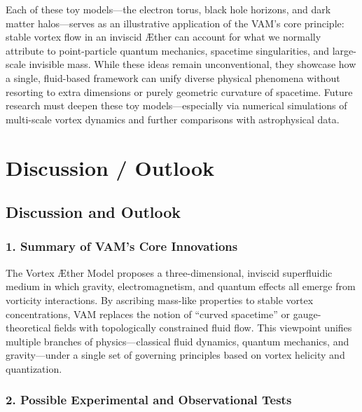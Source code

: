 \documentclass[aps,preprint,superscriptaddress]{revtex4-2}
\begin{document}
    Each of these toy models—the electron torus, black hole horizons, and dark matter halos—serves as an illustrative application of the VAM’s core principle: stable vortex flow in an inviscid Æther can account for what we normally attribute to point-particle quantum mechanics, spacetime singularities, and large-scale invisible mass. While these ideas remain unconventional, they showcase how a single, fluid-based framework can unify diverse physical phenomena without resorting to extra dimensions or purely geometric curvature of spacetime. Future research must deepen these toy models—especially via numerical simulations of multi-scale vortex dynamics and further comparisons with astrophysical data.

    \section{Discussion / Outlook}

    \subsection*{Discussion and Outlook}

    \subsubsection*{1. Summary of VAM’s Core Innovations}
    The Vortex Æther Model proposes a three-dimensional, inviscid superfluidic medium in which gravity, electromagnetism, and quantum effects all emerge from vorticity interactions. By ascribing mass-like properties to stable vortex concentrations, VAM replaces the notion of “curved spacetime” or gauge-theoretical fields with topologically constrained fluid flow. This viewpoint unifies multiple branches of physics—classical fluid dynamics, quantum mechanics, and gravity—under a single set of governing principles based on vortex helicity and quantization.

    \subsubsection*{2. Possible Experimental and Observational Tests}
\end{document}

